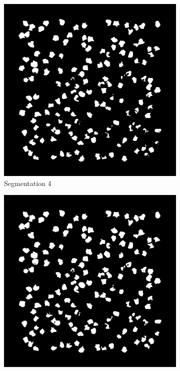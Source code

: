 \documentclass[%
	a4paper, %
	12pt, %
	english, %
	bibtotoc %
]{scrartcl}
\begin{document}
\begin{figure}[H]
    \begin{subfigure}[b]{0.2\textwidth}
        \includegraphics[width=\textwidth]{segmentation_thresholding_88_illuminated.png}
        \caption{Segmentation 4}
        \label{Segmentation4}
    \end{subfigure}
    \hfill
    \begin{subfigure}[b]{0.2\textwidth}
        \includegraphics[width=\textwidth]{segmentation_thresholding_84_illuminated.png}

\end{subfigure}
\end{figure}
\end{document}
